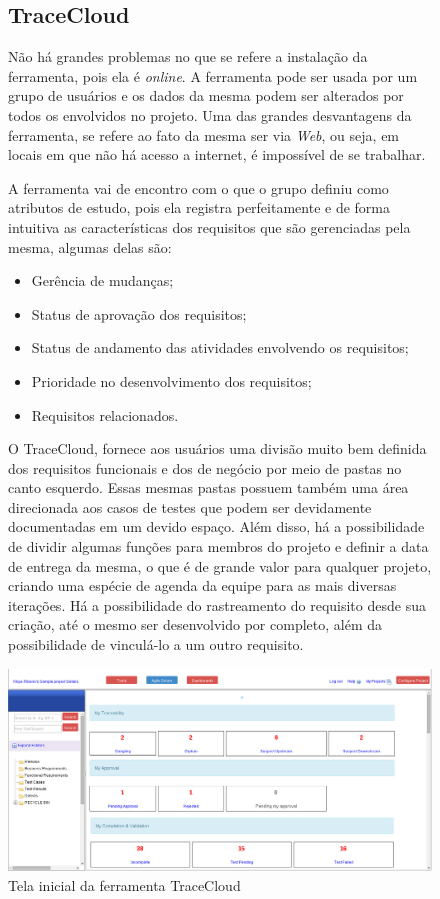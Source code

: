 \begin{figure}[!htb]
\subsection{TraceCloud}
Não há grandes problemas no que se refere a instalação da ferramenta, pois ela é \textit{online}. A ferramenta pode ser usada por um grupo de usuários e os dados da mesma podem ser alterados por todos os envolvidos no projeto. Uma das grandes desvantagens da ferramenta, se refere ao fato da mesma ser via \textit{Web}, ou seja, em locais em que não há acesso a internet, é impossível de se trabalhar.

A ferramenta vai de encontro com o que o grupo definiu como atributos de estudo, pois ela registra perfeitamente e de forma intuitiva as características dos requisitos que são gerenciadas pela mesma, algumas delas são:
\begin{itemize}
  \item Gerência de mudanças;
  \item Status de aprovação dos requisitos;
  \item Status de andamento das atividades envolvendo os requisitos;
  \item Prioridade no desenvolvimento dos requisitos;
  \item Requisitos relacionados.
\end{itemize}

O TraceCloud, fornece aos usuários uma divisão muito bem definida dos requisitos funcionais e dos de negócio por meio de pastas no canto esquerdo. Essas mesmas pastas possuem também uma área direcionada aos casos de testes que podem ser devidamente documentadas em um devido espaço. 
Além disso, há a possibilidade de dividir algumas funções para membros do projeto e definir a data de entrega da mesma, o que é de grande valor para 
qualquer projeto, criando uma espécie de agenda da equipe para as mais diversas iterações. Há a possibilidade do rastreamento do requisito desde sua criação, 
até o mesmo ser desenvolvido por completo, além da possibilidade de vinculá-lo a um outro requisito.

\centering
\includegraphics[scale=0.3]{figuras/trace.jpg}
\caption{Tela inicial da ferramenta TraceCloud}
\label{Rotulo}
\end{figure}

